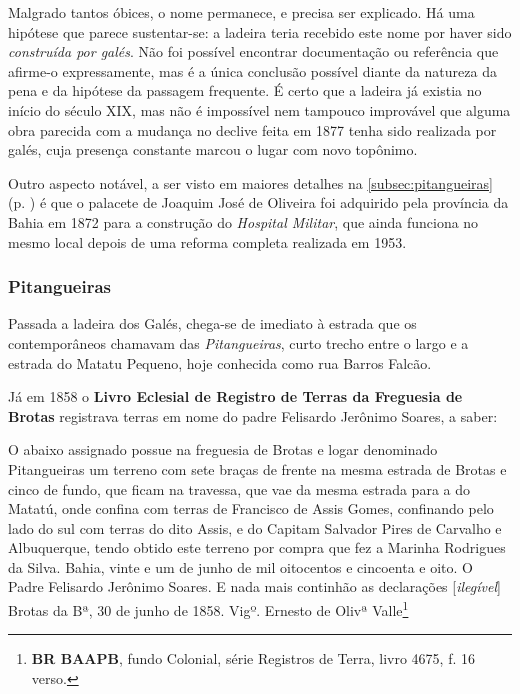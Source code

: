 Malgrado tantos óbices, o nome permanece, e precisa ser explicado. Há uma hipótese que parece sustentar-se: a ladeira teria recebido este nome por haver sido \textit{construída por galés}. Não foi possível encontrar documentação ou referência que afirme-o expressamente, mas é a única conclusão possível diante da natureza da pena e da hipótese da passagem frequente. É certo que a ladeira já existia no início do século XIX, mas não é impossível nem tampouco improvável que alguma obra parecida com a mudança no declive feita em 1877 tenha sido realizada por galés, cuja presença constante marcou o lugar com novo topônimo.

Outro aspecto notável, a ser visto em maiores detalhes na \autoref{subsec:pitangueiras} (p. \pageref{subsec:pitangueiras}) é que o palacete de Joaquim José de Oliveira foi adquirido pela província da Bahia em 1872 para a construção do \textit{Hospital Militar}, que ainda funciona no mesmo local depois de uma reforma completa realizada em 1953.

\subsubsection{Pitangueiras}\label{subsubsec:pitangueiras}

Passada a ladeira dos Galés, chega-se de imediato à estrada que os contemporâneos chamavam das \textit{Pitangueiras}, curto trecho entre o largo e a estrada do Matatu Pequeno, hoje conhecida como rua Barros Falcão. 

Já em 1858 o \textbf{Livro Eclesial de Registro de Terras da Freguesia de Brotas} registrava terras em nome do padre Felisardo Jerônimo Soares, a saber:

\begin{citacao}
O abaixo assignado possue na freguesia de Brotas e logar denominado Pitangueiras um terreno com sete braças de frente na mesma estrada de Brotas e cinco de fundo, que ficam na travessa, que vae da mesma estrada para a do Matatú, onde confina com terras de Francisco de Assis Gomes, confinando pelo lado do sul com terras do dito Assis, e do Capitam Salvador Pires de Carvalho e Albuquerque, tendo obtido este terreno por compra que fez a Marinha Rodrigues da Silva. Bahia, vinte e um de junho de mil oitocentos e cincoenta e oito. O Padre Felisardo Jerônimo Soares. E nada mais continhão as declarações [\textit{ilegível}] Brotas da Bª, 30 de junho de 1858. 
Vigº. Ernesto de Olivª Valle\footnote{\textbf{BR BAAPB}, fundo Colonial, série Registros de Terra, livro 4675, f. 16 verso.}
\end{citacao}

